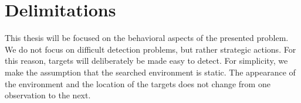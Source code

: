 \section{Delimitations}
\label{sec:delimitations}


This thesis will be focused on the behavioral aspects of the presented problem.
We do not focus on difficult detection problems, but rather strategic actions.
For this reason, targets will deliberately be made easy to detect.
For simplicity, we make the assumption that the searched environment is static.
The appearance of the environment and the location of the targets does not change from one observation to the next.
